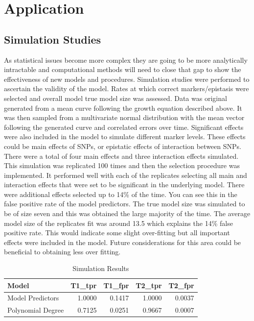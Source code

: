 \documentclass[11pt,]{book}
\theoremstyle{definition}
\theoremstyle{definition}
\theoremstyle{remark}
\begin{document}
\section{Application}\label{application-2}

\subsection{Simulation Studies}\label{simulation-studies-1}

As statistical issues become more complex they are going to be more
analytically intractable and computational methods will need to close
that gap to show the effectiveness of new models and procedures.
Simulation studies were performed to ascertain the validity of the
model. Rates at which correct markers/epistasis were selected and
overall model true model size was assessed. Data was original generated
from a mean curve following the growth equation described above. It was
then sampled from a multivariate normal distribution with the mean
vector following the generated curve and correlated errors over time.
Significant effects were also included in the model to simulate
different marker levels. These effects could be main effects of SNPs, or
epistatic effects of interaction between SNPs. There were a total of
four main effects and three interaction effects simulated. This
simulation was replicated 100 times and then the selection procedure was
implemented. It performed well with each of the replicates selecting all
main and interaction effects that were set to be significant in the
underlying model. There were additional effects selected up to 14\% of
the time. You can see this in the false positive rate of the model
predictors. The true model size was simulated to be of size seven and
this was obtained the large majority of the time. The average model size
of the replicates fit was around 13.5 which explains the 14\% false
positive rate. This would indicate some slight over-fitting but all
important effects were included in the model. Future considerations for
this area could be beneficial to obtaining less over fitting.

\begin{table}

\caption{\label{tab:Chap4SimResults}Simulation Results}
\centering
\begin{tabular}[t]{l|r|r|r|r}
\hline
Model & T1\_tpr & T1\_fpr & T2\_tpr & T2\_fpr\\
\hline
Model Predictors & 1.0000 & 0.1417 & 1.0000 & 0.0037\\
\hline
Polynomial Degree & 0.7125 & 0.0251 & 0.9667 & 0.0007\\
\hline
\end{tabular}
\end{table}
\end{document}
